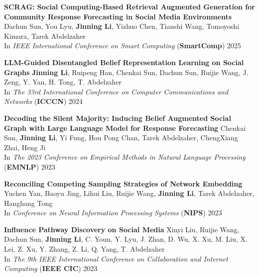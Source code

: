 \documentclass[12pt, letterpaper]{article}
\begin{document}
\textbf{SCRAG: Social Computing-Based Retrieval Augmented Generation for Community Response Forecasting in Social Media Environments}\newline
\footnotesize
Dachun Sun, You Lyu, \textbf{Jinning Li}, Yizhuo Chen, Tianshi Wang, Tomoyoshi Kimura, Tarek Abdelzaher\\
In \emph{IEEE International Conference on Smart Computing} (\textbf{SmartComp}) 2025
\small
\vspace{2pt}

\textbf{LLM-Guided Disentangled Belief Representation Learning on Social Graphs}
\href{http://jinningli.cn/files/papers/icccn.pdf}{}\href{https://github.com/jinningli/SGVGAE}{}\newline
\footnotesize
\textbf{Jinning Li}, Ruipeng Han, Chenkai Sun, Dachun Sun, Ruijie Wang, J. Zeng, Y. Yan, H. Tong, T. Abdelzaher\\
In \emph{The 33rd International Conference on Computer Communications and Networks} (\textbf{ICCCN}) 2024
\small
\vspace{2pt}

\textbf{Decoding the Silent Majority: Inducing Belief Augmented Social Graph with Large Language Model for Response Forecasting}
\href{https://aclanthology.org/2023.emnlp-main.4/}{}\href{https://github.com/chenkaisun/SocialSense}{}
\newline
\footnotesize
Chenkai Sun, \textbf{Jinning Li}, Yi Fung, Hou Pong Chan, Tarek Abdelzaher, ChengXiang Zhai, Heng Ji\\
In \emph{The 2023 Conference on Empirical Methods in Natural Language Processing} (\textbf{EMNLP}) 2023
\small
\vspace{2pt}

\textbf{Reconciling Competing Sampling Strategies of Network Embedding}
\href{https://papers.nips.cc/paper_files/paper/2023/hash/15dc2344ea9bdc01ffb8bb2d692e4018-Abstract-Conference.html}{}\href{https://github.com/yucheny5/SENSEI}{}
\newline
\footnotesize
Yuchen Yan, Baoyu Jing, Lihui Liu, Ruijie Wang, \textbf{Jinning Li}, Tarek Abdelzaher, Hanghang Tong\\
In \emph{Conference on Neural Information Processing Systems} (\textbf{NIPS}) 2023
\small
\vspace{2pt}

\textbf{Influence Pathway Discovery on Social Media}
\href{https://arxiv.org/abs/2309.16071}{}
\newline
\footnotesize
Xinyi Liu, Ruijie Wang, Dachun Sun, \textbf{Jinning Li}, C. Youn, Y. Lyu, J. Zhan, D. Wu, X. Xu, M. Liu,  X. Lei, Z. Xu, Y. Zhang, Z. Li, Q. Yang, T. Abdelzaher\\
In \emph{The 9th IEEE International Conference on Collaboration and Internet Computing} (\textbf{IEEE CIC}) 2023
\small
\vspace{2pt}
\end{document}
